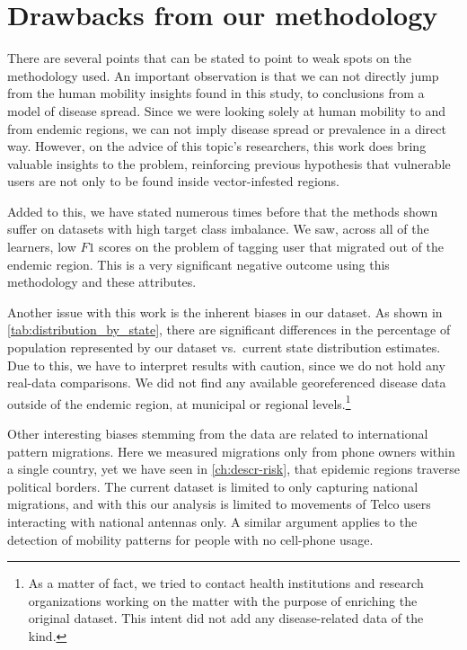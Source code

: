 \section{Drawbacks from our methodology}

There are several points that can be stated to point to weak spots on the methodology used.
An important observation is that we can not directly jump from the human mobility insights found in this study, to conclusions from a model of disease spread.
Since we were looking solely at human mobility to and from endemic regions, we can not imply disease spread or prevalence in a direct way.
However, on the advice of this topic's researchers, this work does bring valuable insights to the problem, reinforcing previous hypothesis that vulnerable users are not only to be found inside vector-infested regions.


Added to this, we have stated numerous times before that the methods shown suffer on datasets with high target class imbalance.
We saw, across all of the learners, low $F1$ scores on the problem of tagging user that migrated out of the endemic region. This is a very significant negative outcome using this methodology and these attributes.

Another issue with this work is the inherent biases in our dataset.
As shown in \cref{tab:distribution_by_state}, there are significant differences in the percentage of population represented by our dataset vs.\ current state distribution estimates.
Due to this, we have to interpret results with caution, since we do not hold any real-data comparisons.
We did not find any available georeferenced disease data outside of the endemic region, at municipal or regional levels.\footnote{As a matter of fact, we tried to contact health institutions and research organizations working on the matter with the purpose of enriching the original dataset.
This intent did not add any disease-related data of the kind.}

Other interesting biases stemming from the data are related to international pattern migrations.
Here we measured migrations only from phone owners within a single country, yet we have seen in \cref{ch:descr-risk}, that  epidemic regions traverse political borders.
The current dataset is limited to only capturing national migrations, and with this our analysis is limited to movements of Telco users interacting with national antennas only.
A similar argument applies to the detection of mobility patterns for people with no cell-phone usage.

